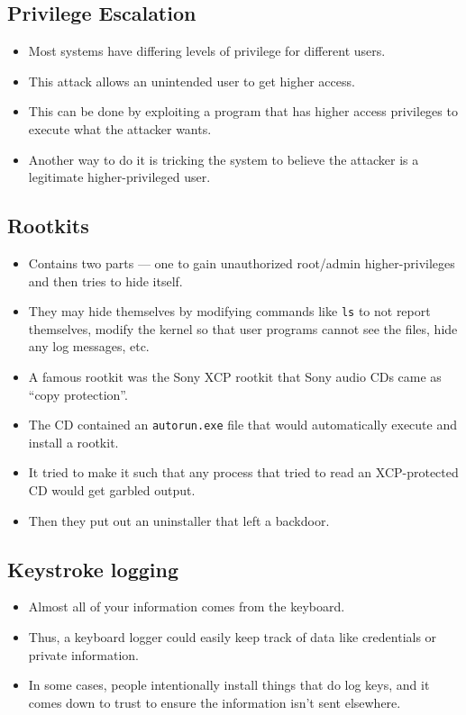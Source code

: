 \documentclass{article}
\begin{document}
\subsection{Privilege Escalation}
\begin{itemize}
    \item Most systems have differing levels of privilege for different users.
    \item This attack allows an unintended user to get higher access.
    \item This can be done by exploiting a program that has higher access privileges to execute what the attacker wants.
    \item Another way to do it is tricking the system to believe the attacker is a legitimate higher-privileged user.
\end{itemize}

\subsection{Rootkits}
\begin{itemize}
    \item Contains two parts --- one to gain unauthorized root/admin higher-privileges and then tries to hide itself.
    \item They may hide themselves by modifying commands like \lstinline{ls} to not report themselves, modify the kernel so that user programs cannot see the files, hide any log messages, etc.
    \item A famous rootkit was the Sony XCP rootkit that Sony audio CDs came as ``copy protection''.
    \item The CD contained an \lstinline{autorun.exe} file that would automatically execute and install a rootkit.
    \item It tried to make it such that any process that tried to read an XCP-protected CD would get garbled output.
    \item Then they put out an uninstaller that left a backdoor.
\end{itemize}

\subsection{Keystroke logging}
\begin{itemize}
    \item Almost all of your information comes from the keyboard.
    \item Thus, a keyboard logger could easily keep track of data like credentials or private information.
    \item In some cases, people intentionally install things that do log keys, and it comes down to trust to ensure the information isn't sent elsewhere.
\end{itemize}
\end{document}

